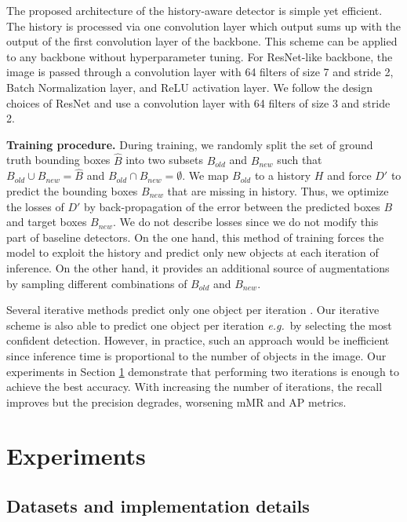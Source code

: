 \documentclass[runningheads]{llncs}
\newcommand{\eg}{\emph{e.g.}\ }
\begin{document}
The proposed architecture of the history-aware detector is simple yet efficient. The history is processed via one convolution layer which output sums up with the output of the first convolution layer of the backbone. This scheme can be applied to any backbone without hyperparameter tuning. For ResNet-like backbone, the image is passed through a convolution layer with 64 filters of size 7 and stride 2, Batch Normalization layer, and ReLU activation layer. We follow the design choices of ResNet and use a convolution layer with 64 filters of size 3 and stride 2.

\textbf{Training procedure.} During training, we randomly split the set of ground truth bounding boxes $\hat{B}$ into two subsets $B_{old}$ and $B_{new}$ such that $B_{old} \cup B_{new}=\hat{B}$ and $B_{old} \cap B_{new}=\emptyset$. We map $B_{old}$ to a history $H$ and force $D'$ to predict the bounding boxes $B_{new}$ that are missing in history. Thus, we optimize the losses of $D'$ by back-propagation of the error between the predicted boxes $B$ and target boxes $B_{new}$. We do not describe losses since we do not modify this part of baseline detectors. On the one hand, this method of training forces the model to exploit the history and predict only new objects at each iteration of inference. On the other hand, it provides an additional source of augmentations by sampling different combinations of $B_{old}$ and $B_{new}$.

Several iterative methods predict only one object per iteration \cite{barinova2012detection,stewart2016end}. Our iterative scheme is also able to predict one object per iteration \eg by selecting the most confident detection. However, in practice, such an approach would be inefficient since inference time is proportional to the number of objects in the image. Our experiments in Section \ref{sec:experiments} demonstrate that performing two iterations is enough to achieve the best accuracy. With increasing the number of iterations, the recall improves but the precision degrades, worsening mMR and AP metrics. 

\section{Experiments}
\label{sec:experiments}

\subsection{Datasets and implementation details}
\end{document}
